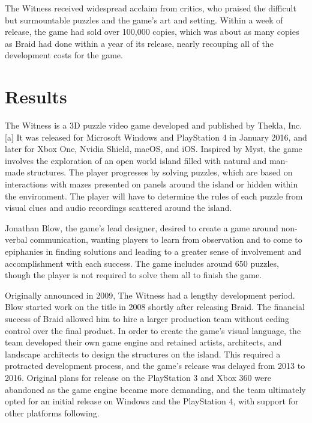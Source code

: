 \documentclass[11pt,a4paper]{scrartcl}
\begin{document}
The Witness received widespread acclaim from critics, who praised the difficult but surmountable puzzles and the game's art and setting. Within a week of release, the game had sold over 100,000 copies, which was about as many copies as Braid had done within a year of its release, nearly recouping all of the development costs for the game.

\section{Results}\label{sec:results}

The Witness is a 3D puzzle video game developed and published by Thekla, Inc.[a] It was released for Microsoft Windows and PlayStation 4 in January 2016, and later for Xbox One, Nvidia Shield, macOS, and iOS. Inspired by Myst, the game involves the exploration of an open world island filled with natural and man-made structures. The player progresses by solving puzzles, which are based on interactions with mazes presented on panels around the island or hidden within the environment. The player will have to determine the rules of each puzzle from visual clues and audio recordings scattered around the island.

\begin{center}
	\resizebox{\linewidth}{!}{ %
	}
\end{center}


Jonathan Blow, the game's lead designer, desired to create a game around non-verbal communication, wanting players to learn from observation and to come to epiphanies in finding solutions and leading to a greater sense of involvement and accomplishment with each success. The game includes around 650 puzzles, though the player is not required to solve them all to finish the game.

Originally announced in 2009, The Witness had a lengthy development period. Blow started work on the title in 2008 shortly after releasing Braid. The financial success of Braid allowed him to hire a larger production team without ceding control over the final product. In order to create the game's visual language, the team developed their own game engine and retained artists, architects, and landscape architects to design the structures on the island. This required a protracted development process, and the game's release was delayed from 2013 to 2016. Original plans for release on the PlayStation 3 and Xbox 360 were abandoned as the game engine became more demanding, and the team ultimately opted for an initial release on Windows and the PlayStation 4, with support for other platforms following.
\end{document}
